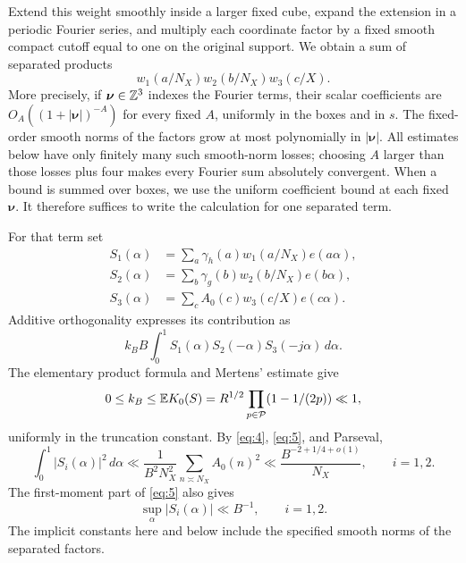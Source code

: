 Extend this weight smoothly inside a larger fixed cube, expand the
extension in a periodic Fourier series, and multiply each coordinate
factor by a fixed smooth compact cutoff equal to one on the original
support.  We obtain a sum of separated products
\[
 w_1(a/N_X)w_2(b/N_X)w_3(c/X).
\]
More precisely, if \(\boldsymbol\nu\in\mathbb Z^3\) indexes the Fourier
terms, their scalar coefficients are
\(O_A((1+|\boldsymbol\nu|)^{-A})\) for every fixed \(A\), uniformly
in the boxes and in \(s\).  The fixed-order smooth norms of the factors
grow at most polynomially in \(|\boldsymbol\nu|\).  All estimates below
have only finitely many such smooth-norm losses; choosing \(A\) larger
than those losses plus four makes every Fourier sum absolutely
convergent.  When a bound is summed over boxes, we use the uniform
coefficient bound at each fixed \(\boldsymbol\nu\).  It therefore
suffices to write the calculation for one separated term.

For that term set
\[
 \begin{split}
 S_1(\alpha)&=\sum_a\gamma_h(a)w_1(a/N_X)e(a\alpha),\\
 S_2(\alpha)&=\sum_b\gamma_g(b)w_2(b/N_X)e(b\alpha),\\
 S_3(\alpha)&=\sum_c A_0(c)w_3(c/X)e(c\alpha).
 \end{split}
\]
Additive orthogonality expresses its contribution as
\[
 k_BB\int_0^1 S_1(\alpha)S_2(-\alpha)S_3(-j\alpha)\,d\alpha.
\]
The elementary product formula and Mertens' estimate give
\[
 0\le k_B\le\mathbb E K_0(S)
 =R^{1/2}\prod_{p\in\mathcal P}(1-1/(2p))\ll1,
\]
uniformly in the truncation constant.  By \eqref{eq:4},
\eqref{eq:5}, and Parseval,
\begin{equation}\label{eq:35}
 \int_0^1|S_i(\alpha)|^2\,d\alpha
 \ll\frac1{B^2N_X^2}\sum_{n\asymp N_X}A_0(n)^2
 \ll\frac{B^{-2+1/4+o(1)}}{N_X},\qquad i=1,2.
\end{equation}
The first-moment part of \eqref{eq:5} also gives
\begin{equation}\label{eq:kernel-trivial-sums}
 \sup_\alpha|S_i(\alpha)|\ll B^{-1},\qquad i=1,2.
\end{equation}
The implicit constants here and below include the specified smooth
norms of the separated factors.

